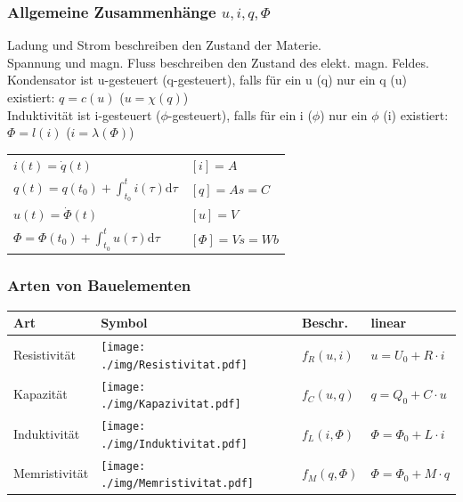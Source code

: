 \documentclass[fs, footer]{latex4ei}
\begin{document}
\begin{multicols*}{4}
    \subsubsection{Allgemeine Zusammenhänge $u,i,q,\Phi$}
    Ladung und Strom beschreiben den Zustand der Materie.\\
    Spannung und magn. Fluss beschreiben den Zustand des elekt. magn. Feldes.\\
    Kondensator ist u-gesteuert (q-gesteuert), falls für ein u (q) nur ein q (u)  existiert: $q=c(u)$ ($u=\chi(q)$) \\
    Induktivität ist i-gesteuert ($\phi$-gesteuert), falls für ein i ($\phi$) nur ein $\phi$ (i) existiert: $\Phi=l(i)$ ($i=\lambda(\Phi)$) \\
    \begin{tabular}{l|l}
        $i(t) = \dot q(t)$                                      & $[i]=A$        \\
        $q(t) = q(t_0) + \int_{t_0}^t i(\tau) \mathrm d\tau$    & $[q]=As=C$     \\ \hline
        $u(t) = \dot \Phi(t)$                                   & $[u]=V$        \\
        $\Phi = \Phi(t_0) + \int_{t_0}^t u(\tau) \mathrm d\tau$ & $[\Phi]=Vs=Wb$ \\
    \end{tabular}

    \subsubsection{Arten von Bauelementen}
    \begin{tabular}{l|l|l|l}
        Art           & Symbol                                                  & Beschr.       & linear                      \\ \hline
        Resistivität  & \texttt{[image: ./img/Resistivitat.pdf]}  & $f_R(u,i)$    & $u = U_0 + R \cdot i$       \\
        Kapazität     & \texttt{[image: ./img/Kapazivitat.pdf]}   & $f_C(u,q)$    & $q = Q_0 + C \cdot u$       \\
        Induktivität  & \texttt{[image: ./img/Induktivitat.pdf]}  & $f_L(i,\Phi)$ & $\Phi = \Phi_0 + L \cdot i$ \\
        Memristivität & \texttt{[image: ./img/Memristivitat.pdf]} & $f_M(q,\Phi)$ & $\Phi = \Phi_0 + M \cdot q$ \\
    \end{tabular}

\end{multicols*}
\end{document}

